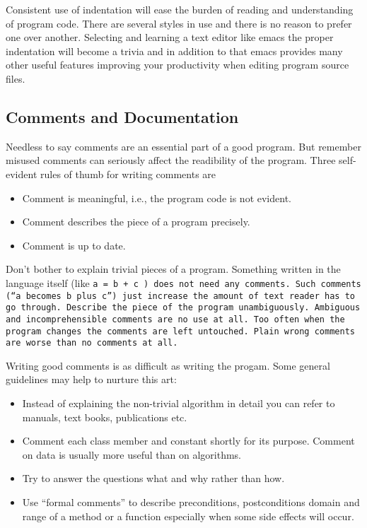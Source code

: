 Consistent  use of  indentation will  ease the  burden of  reading and
understanding of  program code.  There  are several styles in  use and
there is no reason to  prefer one over another. Selecting and learning
a text editor  like emacs the proper indentation  will become a trivia
and  in addition  to that  emacs provides  many other  useful features
improving your productivity when editing program source files.

\subsection{Comments and Documentation}
Needless to say  comments are an essential part of  a good program. But
remember misused comments can  seriously affect the readibility of the
program. Three self-evident rules of thumb for writing comments are

\begin{itemize}
  \item Comment is meaningful, i.e., the program code is not evident.
  \item Comment describes the piece of a program precisely.
  \item Comment is up to date. 
\end{itemize}
   
Don't bother to explain trivial pieces of a program. Something written
in the  language itself (like  \tt a =  b + c  \rm) does not  need any
comments. Such  comments (``a  becomes b plus  c'') just  increase the
amount of  text reader has to  go through.  Describe the  piece of the
program unambiguously. Ambiguous  and incomprehensible comments are no
use at all.  Too often when the program changes  the comments are left
untouched. Plain wrong comments are worse than no comments at all. 

Writing good comments is as difficult as writing the progam. Some
general guidelines may help to nurture this art:

\begin{itemize}
  \item Instead of explaining  the non-trivial algorithm in detail you
        can  refer  to  manuals,  text books,  publications  etc.
  \item Comment each class member and constant shortly for its
        purpose.  Comment on data is usually more useful than on algorithms.
  \item Try to answer the questions what and why rather than how. 
  \item Use ``formal comments'' to describe preconditions, postconditions 
        domain and range of a method or a function especially when
        some side effects will occur.
\end{itemize}
     
